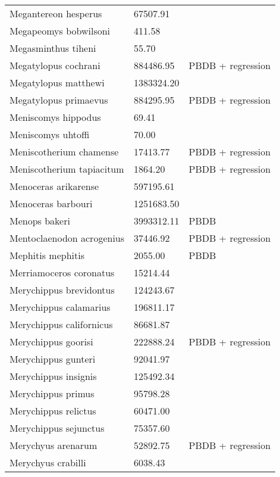 \documentclass{article}
\begin{document}
\begin{center}
\begin{longtable}{p{} p{} p{}}
    Megantereon hesperus & 67507.91 & \cite{Tomiya2013} \\ 
    Megapeomys bobwilsoni & 411.58 & \cite{Tomiya2013} \\ 
    Megasminthus tiheni & 55.70 & \cite{Tomiya2013} \\ 
    Megatylopus cochrani & 884486.95 & PBDB + regression \\ 
    Megatylopus matthewi & 1383324.20 & \cite{Tomiya2013} \\ 
    Megatylopus primaevus & 884295.95 & PBDB + regression \\ 
    Meniscomys hippodus & 69.41 & \cite{Tomiya2013} \\ 
    Meniscomys uhtoffi & 70.00 & \cite{McKenna2011} \\ 
    Meniscotherium chamense & 17413.77 & PBDB + regression \\ 
    Meniscotherium tapiacitum & 1864.20 & PBDB + regression \\ 
    Menoceras arikarense & 597195.61 & \cite{Tomiya2013} \\ 
    Menoceras barbouri & 1251683.50 & \cite{Tomiya2013} \\ 
    Menops bakeri & 3993312.11 & PBDB \\ 
    Mentoclaenodon acrogenius & 37446.92 & PBDB + regression \\ 
    Mephitis mephitis & 2055.00 & PBDB \\ 
    Merriamoceros coronatus & 15214.44 & \cite{Tomiya2013} \\ 
    Merychippus brevidontus & 124243.67 & \cite{Tomiya2013} \\ 
    Merychippus calamarius & 196811.17 & \cite{Tomiya2013} \\ 
    Merychippus californicus & 86681.87 & \cite{Tomiya2013} \\ 
    Merychippus goorisi & 222888.24 & PBDB + regression \\ 
    Merychippus gunteri & 92041.97 & \cite{Tomiya2013} \\ 
    Merychippus insignis & 125492.34 & \cite{Tomiya2013} \\ 
    Merychippus primus & 95798.28 & \cite{Tomiya2013} \\ 
    Merychippus relictus & 60471.00 & \cite{McKenna2011} \\ 
    Merychippus sejunctus & 75357.60 & \cite{Tomiya2013} \\ 
    Merychyus arenarum & 52892.75 & PBDB + regression \\ 
    Merychyus crabilli & 6038.43 & \cite{Johanson1996} \\ 

\end{longtable}
\end{center}
\end{document}
